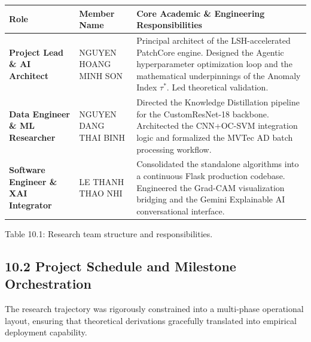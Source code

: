 \documentclass[12pt, a4paper, oneside]{report}
\begin{document}
{\def\LTcaptype{none} %
\begin{longtable}[]{@{}lll@{}}
\toprule\noalign{}
Role & Member Name & Core Academic \& Engineering Responsibilities \\
\midrule\noalign{}
\endhead
\bottomrule\noalign{}
\endlastfoot
\textbf{Project Lead \& AI Architect} & NGUYEN HOANG MINH SON & Principal architect of the LSH-accelerated PatchCore engine. Designed the Agentic hyperparameter optimization loop and the mathematical underpinnings of the Anomaly Index \(\tau^*\). Led theoretical validation. \\
\textbf{Data Engineer \& ML Researcher} & NGUYEN DANG THAI BINH & Directed the Knowledge Distillation pipeline for the CustomResNet-18 backbone. Architected the CNN+OC-SVM integration logic and formalized the MVTec AD batch processing workflow. \\
\textbf{Software Engineer \& XAI Integrator} & LE THANH THAO NHI & Consolidated the standalone algorithms into a continuous Flask production codebase. Engineered the Grad-CAM visualization bridging and the Gemini Explainable AI conversational interface. \\
\end{longtable}
}

Table 10.1: Research team structure and responsibilities.

\subsection{10.2 Project Schedule and Milestone Orchestration}\label{project-schedule-and-milestone-orchestration}

The research trajectory was rigorously constrained into a multi-phase operational layout, ensuring that theoretical derivations gracefully translated into empirical deployment capability.
\end{document}
